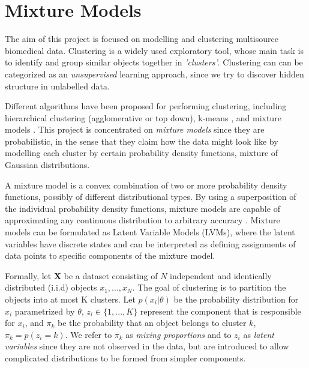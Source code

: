 \section{Mixture Models} \label{mixture-models-section}

The aim of this project is focused on modelling and clustering multisource biomedical data. Clustering is a widely used exploratory tool, whose main task is to identify and group similar objects together in \emph{'clusters'}. Clustering can can be categorized as an \emph{unsupervised} learning approach, since we try to discover hidden structure in unlabelled data.     

Different algorithms have been proposed for performing clustering, including hierarchical clustering (agglomerative or top down), k-means \citep{MacQueen1967}, and mixture models \citep{Titterington1985, McLachlan1988}. This project is concentrated on \emph{mixture models} since they are probabilistic, in the sense that they claim how the data might look like by modelling each cluster by certain probability density functions, \eg mixture of Gaussian distributions.  

A mixture model is a convex combination of two or more probability density functions, possibly of different distributional types. By using a superposition of the individual probability density functions, mixture models are capable of approximating any continuous distribution to arbitrary accuracy \citep{Marin2005}. Mixture models can be formulated as Latent Variable Models (LVMs), where the latent variables have discrete states and can be interpreted as defining assignments of data points to specific components of the mixture model.
 
Formally, let $\mathbf{X}$ be a dataset consisting of $N$ independent and identically distributed (i.i.d) objects $x_{1}, ..., x_{N}$. The goal of clustering is to partition the objects into at most K clusters. Let $p(x_{i}|\theta)$ be the probability distribution for $x_{i}$ parametrized by $\theta$, $z_{i} \in \lbrace 1,...,K \rbrace$ represent the component that is responsible for $x_{i}$, and $\pi_{k}$ be the probability that an object belongs to cluster $k$, \ie $\pi_{k} = p(z_{i} = k)$. We refer to $\pi_{k}$ as \emph{mixing proportions} and to $z_{i}$ as \emph{latent variables} since they are not observed in the data, but are introduced to allow complicated distributions to be formed from simpler components. 

